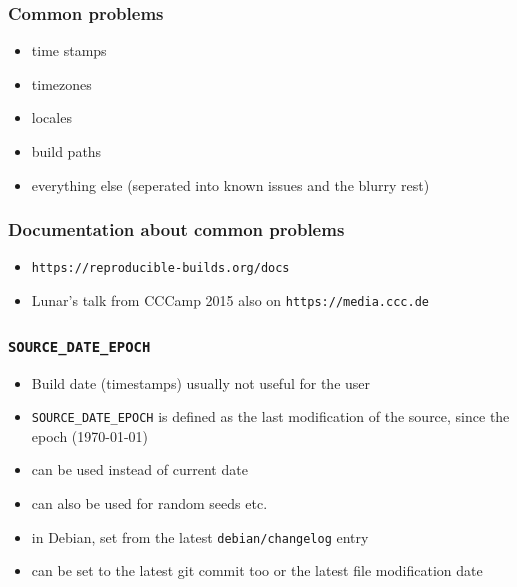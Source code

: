 \documentclass[14pt,aspectratio=169]{beamer}
\newif\ifplacelogo
\begin{document}
\placelogofalse

\begin{frame}
 \frametitle{Common problems}

 \begin{itemize}
  \item time stamps
  \item timezones
  \item locales
  \item build paths
  \item everything else (seperated into known issues and the blurry rest)
 \end{itemize}
\end{frame}

\begin{frame}
 \frametitle{Documentation about common problems}
 \begin{itemize}
  \item \texttt{https://reproducible-builds.org/docs}
  \item Lunar's talk from CCCamp 2015 also on
  \texttt{https://media.ccc.de}
 \end{itemize}
\end{frame}


\begin{frame}
 \frametitle{\texttt{SOURCE\_DATE\_EPOCH}}

 \begin{itemize}
  \item Build date (timestamps) usually not useful for the user
  \item \texttt{SOURCE\_DATE\_EPOCH} is defined as the last modification of
  the source, since the epoch (1970-01-01)
  \item can be used instead of current date
  \item can also be used for random seeds etc.
  \item in Debian, set from the latest \texttt{debian/changelog} entry
  \item can be set to the latest git commit too or the latest file
  modification date
 \end{itemize}
\end{frame}
\end{document}
